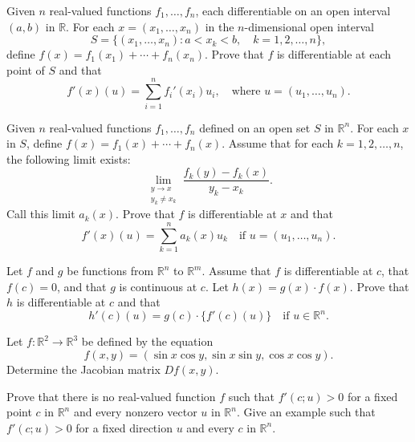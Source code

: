 \begin{problembox}
Given \( n \) real-valued functions \( f_1, \ldots, f_n \), each differentiable on an open interval \( (a, b) \) in \( \mathbb{R} \). For each \( x = (x_1, \ldots, x_n) \) in the \( n \)-dimensional open interval
\[S = \{(x_1, \ldots, x_n): a < x_k < b, \quad k = 1, 2, \ldots, n\},\]
define \( f(x) = f_1(x_1) + \cdots + f_n(x_n) \). Prove that \( f \) is differentiable at each point of \( S \) and that
\[f'(x)(u) = \sum_{i=1}^{n} f_i'(x_i)u_i, \quad \text{where } u = (u_1, \ldots, u_n).\]
\end{problembox}

\begin{problembox}
Given \( n \) real-valued functions \( f_1, \ldots, f_n \) defined on an open set \( S \) in \( \mathbb{R}^n \). For each \( x \) in \( S \), define \( f(x) = f_1(x) + \cdots + f_n(x) \). Assume that for each \( k = 1, 2, \ldots, n \), the following limit exists:
\[\lim_{\substack{y \to x \\ y_k \neq x_k}} \frac{f_k(y) - f_k(x)}{y_k - x_k}.\]
Call this limit \( a_k(x) \). Prove that \( f \) is differentiable at \( x \) and that
\[f'(x)(u) = \sum_{k=1}^{n} a_k(x) u_k \quad \text{if } u = (u_1, \ldots, u_n).\]
\end{problembox}

\begin{problembox}
Let \( f \) and \( g \) be functions from \( \mathbb{R}^n \) to \( \mathbb{R}^m \). Assume that \( f \) is differentiable at \( c \), that \( f(c) = 0 \), and that \( g \) is continuous at \( c \). Let \( h(x) = g(x) \cdot f(x) \). Prove that \( h \) is differentiable at \( c \) and that
\[h'(c)(u) = g(c) \cdot \{f'(c)(u)\} \quad \text{if } u \in \mathbb{R}^n.\]
\end{problembox}

\begin{problembox}
Let \( f : \mathbb{R}^2 \to \mathbb{R}^3 \) be defined by the equation
\[f(x, y) = (\sin x \cos y, \sin x \sin y, \cos x \cos y).\]
Determine the Jacobian matrix \( Df(x, y) \).
\end{problembox}


\begin{problembox}
Prove that there is no real-valued function \( f \) such that \( f'(c; u) > 0 \) for a fixed point \( c \) in \( \mathbb{R}^n \) and every nonzero vector \( u \) in \( \mathbb{R}^n \). Give an example such that \( f'(c; u) > 0 \) for a fixed direction \( u \) and every \( c \) in \( \mathbb{R}^n \).
\end{problembox}


